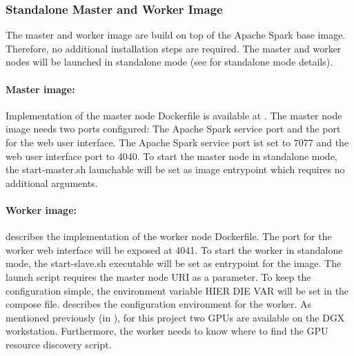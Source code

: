 

\subsubsection{Standalone Master and Worker Image}
The master and worker image are build on top of the  Apache Spark base image.
Therefore, no additional installation steps are required.
The master and worker nodes will be launched in standalone mode (see  for standalone mode details).


\paragraph{Master image:}
Implementation of the master node Dockerfile is available at .
The master node image needs two ports configured: The Apache Spark service port and the port for the web user interface.
The Apache Spark service port ist set to 7077 and the web user interface port to 4040. 
To start the master node in standalone mode, the start-master.sh launchable will be set as image entrypoint which requires no additional arguments.


\paragraph{Worker image:}
 describes the implementation of the worker node Dockerfile.
The port for the worker web interface will be exposed at 4041.
To start the worker in standalone mode, the start-slave.sh executable will be set as entrypoint for the image.
The launch script requires the master node URI as a parameter. To keep the configuration simple, the environment variable HIER DIE VAR will be set in the compose file.
 describes the configuration environment for the worker. As mentioned previously (in ), for this project two GPUs are available on the DGX workstation. Furthermore, the worker needs to know where to find the GPU resource discovery script.

